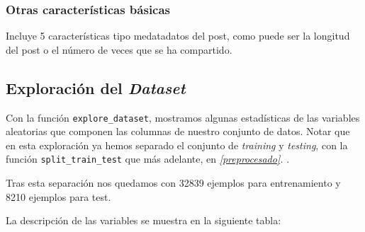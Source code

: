 \documentclass[11pt]{article}
\begin{document}
\subsubsection{Otras características básicas}

Incluye 5 características tipo medatadatos del post, como puede ser la longitud del post o el número de veces que se ha compartido.

\subsection{Exploración del \emph{Dataset}} \label{exploracion_datos}

Con la función \lstinline{explore_dataset}, mostramos algunas estadísticas de las variables aleatorias que componen las columnas de nuestro conjunto de datos. Notar que en esta exploración ya hemos separado el conjunto de \emph{training} y \emph{testing}, con la función \lstinline{split_train_test} que más adelante, en \emph{\ref{preprocesado}. }.

Tras esta separación nos quedamos con 32839 ejemplos para entrenamiento y 8210 ejemplos para test.

La descripción de las variables se muestra en la siguiente tabla:
\end{document}
